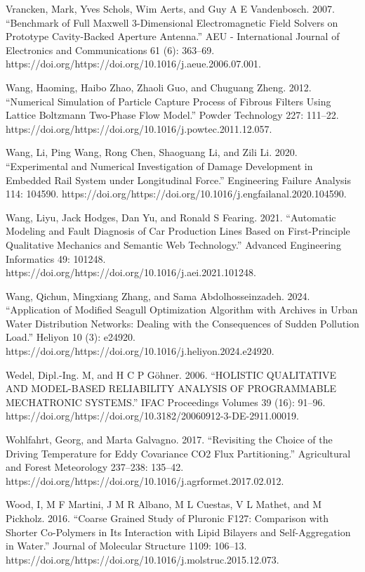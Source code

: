 \documentclass[utf8]{gradu3}
\begin{document}
Vrancken, Mark, Yves Schols, Wim Aerts, and Guy A E Vandenbosch. 2007. “Benchmark of Full Maxwell 3-Dimensional Electromagnetic Field Solvers on Prototype Cavity-Backed Aperture Antenna.” AEU - International Journal of Electronics and Communications 61 (6): 363–69. https://doi.org/https://doi.org/10.1016/j.aeue.2006.07.001.

Wang, Haoming, Haibo Zhao, Zhaoli Guo, and Chuguang Zheng. 2012. “Numerical Simulation of Particle Capture Process of Fibrous Filters Using Lattice Boltzmann Two-Phase Flow Model.” Powder Technology 227: 111–22. https://doi.org/https://doi.org/10.1016/j.powtec.2011.12.057.

Wang, Li, Ping Wang, Rong Chen, Shaoguang Li, and Zili Li. 2020. “Experimental and Numerical Investigation of Damage Development in Embedded Rail System under Longitudinal Force.” Engineering Failure Analysis 114: 104590. https://doi.org/https://doi.org/10.1016/j.engfailanal.2020.104590.

Wang, Liyu, Jack Hodges, Dan Yu, and Ronald S Fearing. 2021. “Automatic Modeling and Fault Diagnosis of Car Production Lines Based on First-Principle Qualitative Mechanics and Semantic Web Technology.” Advanced Engineering Informatics 49: 101248. https://doi.org/https://doi.org/10.1016/j.aei.2021.101248.

Wang, Qichun, Mingxiang Zhang, and Sama Abdolhosseinzadeh. 2024. “Application of Modified Seagull Optimization Algorithm with Archives in Urban Water Distribution Networks: Dealing with the Consequences of Sudden Pollution Load.” 
Heliyon 10 (3): e24920. https://doi.org/https://doi.org/10.1016/j.heliyon.2024.e24920.

Wedel, Dipl.-Ing. M, and H C P Göhner. 2006. “HOLISTIC QUALITATIVE AND MODEL-BASED RELIABILITY ANALYSIS OF PROGRAMMABLE MECHATRONIC SYSTEMS.” IFAC Proceedings Volumes 39 (16): 91–96. https://doi.org/https://doi.org/10.3182/20060912-3-DE-2911.00019.

Wohlfahrt, Georg, and Marta Galvagno. 2017. “Revisiting the Choice of the Driving Temperature for Eddy Covariance CO2 Flux Partitioning.” Agricultural and Forest Meteorology 237–238: 135–42. https://doi.org/https://doi.org/10.1016/j.agrformet.2017.02.012.

Wood, I, M F Martini, J M R Albano, M L Cuestas, V L Mathet, and M Pickholz. 2016. “Coarse Grained Study of Pluronic F127: Comparison with Shorter Co-Polymers in Its Interaction with Lipid Bilayers and Self-Aggregation in Water.” Journal of Molecular Structure 1109: 106–13. https://doi.org/https://doi.org/10.1016/j.molstruc.2015.12.073.
\end{document}
